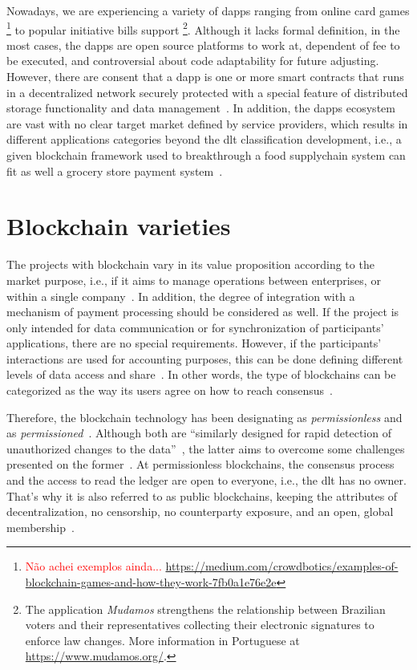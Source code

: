 Nowadays, we are experiencing a variety of \glspl{dapp} ranging from online card games%
\footnote{\textcolor{red}{Não achei exemplos ainda...} \href{Outros casos a se considerar!}{https://medium.com/crowdbotics/examples-of-blockchain-games-and-how-they-work-7fb0a1e76e2e}}
to popular initiative bills support%
\footnote{The application \emph{Mudamos} strengthens the relationship between Brazilian voters and their representatives collecting their electronic signatures to enforce law changes. More information in Portuguese at \href{https://www.mudamos.org/}{https://www.mudamos.org/}.}.
Although it lacks formal definition, in the most cases, the \glspl{dapp} are open source platforms to work at,
dependent of fee to be executed,
and controversial about code adaptability for future adjusting.
However, there are consent that a \gls{dapp} is one or more smart contracts that runs in a decentralized network securely protected with a special feature of distributed storage functionality and data management~\cite{swan2015blockchain, pwc2016}.
In addition, the \glspl{dapp} ecosystem are vast with no clear target market defined by service providers, which results in different applications categories beyond the \gls{dlt} classification development, i.e.,
a given blockchain framework used to breakthrough a food supplychain system can fit as well a grocery store payment system~\cite{gartner}.

\section{Blockchain varieties}
\label{sec:varieties}

The projects with blockchain vary in its value proposition according to the market purpose, i.e.,
if it aims to manage operations between enterprises, or within a single company~\cite{gartner}. %
In addition, the degree of integration with a mechanism of payment processing should be considered as well.
If the project is only intended for data communication or for synchronization of participants' applications, there are no special requirements.
However, if the participants' interactions are used for accounting purposes, this can be done defining different levels of data access and share~\cite{blocktrading}.
In other words, the type of blockchains can be categorized as the way its users agree on how to reach consensus~\cite{itu2017}.

Therefore, the blockchain technology has been designating as \emph{permissionless} and as \emph{permissioned}~\cite{itu2017,peck2017}.
Although both are ``similarly designed for rapid detection of unauthorized changes to the data''~\cite{itu2017},
the latter aims to overcome some challenges presented on the former~\cite{peck2017}.
At permissionless blockchains, the consensus process and the access to read the ledger are open to everyone, i.e., the \gls{dlt} has no owner.
That's why it is also referred to as public blockchains, keeping the attributes of decentralization, no censorship, no counterparty exposure, and an open, global membership~\cite{itu2017}.

